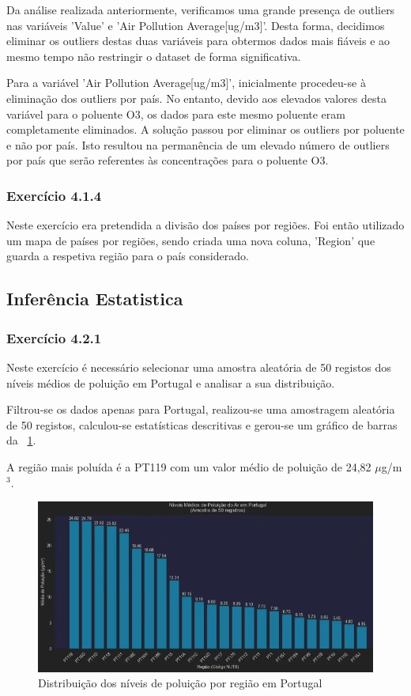 \documentclass[conference]{IEEEtran}
\begin{document}
Da análise realizada anteriormente, verificamos uma grande presença de outliers nas variáveis 'Value' e 'Air Pollution Average[ug/m3]'.
Desta forma, decidimos eliminar os outliers destas duas variáveis para obtermos dados mais fiáveis e ao mesmo tempo não restringir o dataset de forma significativa. 

Para a variável 'Air Pollution Average[ug/m3]', inicialmente procedeu-se à eliminação dos outliers por país. No entanto, devido aos elevados valores desta variável para o poluente O3, os dados para este mesmo poluente eram completamente eliminados. A solução passou por eliminar os outliers por poluente e não por país. Isto resultou na permanência de um elevado número de outliers por país que serão referentes às concentrações para o poluente O3.

\medskip
\subsubsection{\textbf{Exercício 4.1.4}}

Neste exercício era pretendida a divisão dos países por regiões. Foi então utilizado um mapa de países por regiões, sendo criada uma nova coluna, 'Region' que guarda a respetiva região para o país considerado.

\subsection{Inferência Estatistica}
\medskip
\subsubsection{\textbf{Exercício 4.2.1}}

Neste exercício é necessário selecionar uma amostra aleatória de 50 registos dos níveis médios de poluição em Portugal e analisar a sua distribuição.

Filtrou-se os dados apenas para Portugal, realizou-se uma amostragem aleatória de 50 registos, calculou-se estatísticas descritivas e gerou-se um gráfico de barras da \figurename~\ref{fig:polportugal}.

A região mais poluída é a PT119 com um valor médio de poluição de 24,82 $\mu$g/m$^3$.

\begin{figure}
	\centering
	\includegraphics[width=0.9\linewidth]{pol_portugal.png}
	\caption{Distribuição dos níveis de poluição por região em Portugal}
	\label{fig:polportugal}
\end{figure}
\end{document}
